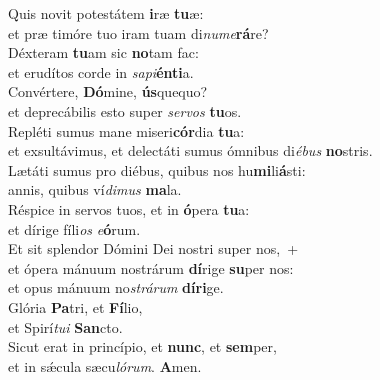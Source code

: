 \oddverse Quis novit potestátem \textbf{i}ræ \textbf{tu}æ:~\*\\
\oddverse et præ timóre tuo iram tuam di\textit{nu}\textit{me}\textbf{rá}re?\\
\evenverse Déxteram \textbf{tu}am sic \textbf{no}tam fac:~\*\\
\evenverse et erudítos corde in \textit{sa}\textit{pi}\textbf{én}\textbf{ti}a.\\
\oddverse Convértere, \textbf{Dó}mine, \textbf{ús}quequo?~\*\\
\oddverse et deprecábilis esto super \textit{ser}\textit{vos} \textbf{tu}os.\\
\evenverse Repléti sumus mane miseri\textbf{cór}dia \textbf{tu}a:~\*\\
\evenverse et exsultávimus, et delectáti sumus ómnibus di\textit{é}\textit{bus} \textbf{no}stris.\\
\oddverse Lætáti sumus pro diébus, quibus nos hu\textbf{mi}li\textbf{á}sti:~\*\\
\oddverse annis, quibus ví\textit{di}\textit{mus} \textbf{ma}la.\\
\evenverse Réspice in servos tuos, et in \textbf{ó}pera \textbf{tu}a:~\*\\
\evenverse et dírige fíli\textit{os} \textit{e}\textbf{ó}rum.\\
\oddverse Et sit splendor Dómini Dei nostri super nos,~+\\
\oddverse  et ópera mánuum nostrárum \textbf{dí}rige \textbf{su}per nos:~\*\\
\oddverse et opus mánuum no\textit{strá}\textit{rum} \textbf{dí}\textbf{ri}ge.\\
\evenverse Glória \textbf{Pa}tri, et \textbf{Fí}lio,~\*\\
\evenverse et Spirí\textit{tu}\textit{i} \textbf{San}cto.\\
\oddverse Sicut erat in princípio, et \textbf{nunc}, et \textbf{sem}per,~\*\\
\oddverse et in sǽcula sæcu\textit{ló}\textit{rum}. \textbf{A}men.\\
